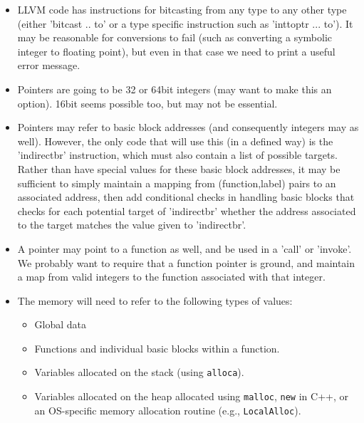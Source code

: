 \documentclass{article}
\begin{document}
\begin{itemize}

  \item LLVM code has instructions for bitcasting from any type to any other
          type (either 'bitcast .. to' or a type specific instruction such as
          'inttoptr ... to').  It may be reasonable for conversions to fail
          (such as converting a symbolic integer to floating point), but even
          in that case we need to print a useful error message.

  \item Pointers are going to be 32 or 64bit integers (may want to make this an
          option). 16bit seems possible too, but may not be essential.

  \item Pointers may refer to basic block addresses (and consequently integers
          may as well).  However, the only code that will use this (in a
          defined way) is the 'indirectbr' instruction, which must also contain
          a list of possible targets.  Rather than have special values for
          these basic block addresses, it may be sufficient to simply maintain
          a mapping from (function,label) pairs to an associated address, then
          add conditional checks in handling basic blocks that checks for each
          potential target of 'indirectbr' whether the address associated to
          the target matches the value given to 'indirectbr'.


  \item A pointer may point to a function as well, and be used in a 'call' or
          'invoke'.  We probably want to require that a function pointer is
          ground, and maintain a map from valid integers to the function
          associated with that integer.

  \item The memory will need to refer to the following types of values:
  \begin{itemize}
    \item Global data
    \item Functions and individual basic blocks within a function.
    \item Variables allocated on the stack (using \texttt{alloca}).
    \item Variables allocated on the heap allocated using \texttt{malloc}, \texttt{new} in C++, 
            or an OS-specific memory allocation routine (e.g., \texttt{LocalAlloc}).
   \end{itemize}
\end{itemize}
\end{document}

